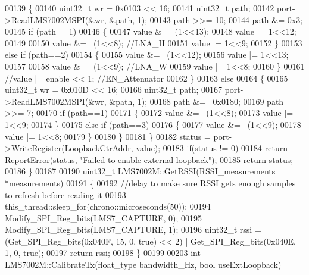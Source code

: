 \begin{DoxyCode}
00139         \{
00140             uint32\_t wr = 0x0103 << 16;
00141             uint32\_t path;
00142             port->ReadLMS7002MSPI(&wr, &path, 1);
00143             path >>= 10;
00144             path &= 0x3;
00145             \textcolor{keywordflow}{if} (path==1)
00146             \{
00147                 value &= ~(1<<13);
00148                 value |= 1<<12;
00149 
00150                 value &= ~(1<<8); \textcolor{comment}{//LNA\_H}
00151                 value |= 1<<9;
00152             \}
00153             \textcolor{keywordflow}{else} \textcolor{keywordflow}{if} (path==2)
00154             \{
00155                 value &= ~(1<<12);
00156                 value |= 1<<13;
00157 
00158                 value &= ~(1<<9); \textcolor{comment}{//LNA\_W}
00159                 value |= 1<<8;
00160             \}
00161             \textcolor{comment}{//value |= enable << 1; //EN\_Attenuator}
00162         \}
00163         \textcolor{keywordflow}{else}
00164         \{
00165             uint32\_t wr = 0x010D << 16;
00166             uint32\_t path;
00167             port->ReadLMS7002MSPI(&wr, &path, 1);
00168             path &= ~0x0180;
00169             path >>= 7;
00170             \textcolor{keywordflow}{if} (path==1)
00171             \{
00172                 value &= ~(1<<8);
00173                 value |= 1<<9;
00174             \}
00175             \textcolor{keywordflow}{else} \textcolor{keywordflow}{if} (path==3)
00176             \{
00177                 value &= ~(1<<9);
00178                 value |= 1<<8;
00179             \}
00180         \}
00181     \}
00182     status = port->WriteRegister(LoopbackCtrAddr, value);
00183     \textcolor{keywordflow}{if}(status != 0)
00184         \textcolor{keywordflow}{return} ReportError(status, \textcolor{stringliteral}{"Failed to enable external loopback"});
00185     \textcolor{keywordflow}{return} status;
00186 \}
00187 
00190 uint32\_t LMS7002M::GetRSSI(RSSI_measurements *measurements)
00191 \{
00192     \textcolor{comment}{//delay to make sure RSSI gets enough samples to refresh before reading it}
00193     this\_thread::sleep\_for(chrono::microseconds(50));
00194     Modify_SPI_Reg_bits(LMS7_CAPTURE, 0);
00195     Modify_SPI_Reg_bits(LMS7_CAPTURE, 1);
00196     uint32\_t rssi = (Get_SPI_Reg_bits(0x040F, 15, 0, \textcolor{keyword}{true}) << 2) | 
      Get_SPI_Reg_bits(0x040E, 1, 0, \textcolor{keyword}{true});
00197     \textcolor{keywordflow}{return} rssi;
00198 \}
00199 
00203 \textcolor{keywordtype}{int} LMS7002M::CalibrateTx(float_type bandwidth\_Hz, \textcolor{keywordtype}{bool} useExtLoopback)

\end{DoxyCode}

